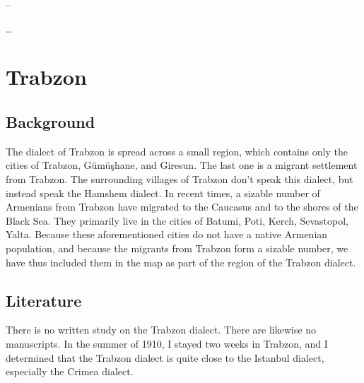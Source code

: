 – 

… 



\chapter{Trabzon} \label{chapter:Trabzon}
\section{Background}
\begin{adjarianpage}\label{page:178}\end{adjarianpage}%

The dialect of Trabzon is spread across a small region, which contains only the cities of Trabzon, Gümüşhane, and Giresun. The last one is a migrant settlement from Trabzon. The surrounding villages of Trabzon don't speak this dialect, but instead speak the Hamshem dialect. In recent times, a sizable number of Armenians from Trabzon have migrated to the Caucasus and to the shores of the Black Sea. They primarily live in the cities of Batumi, Poti, Kerch, Sevastopol, Yalta. Because these aforementioned cities do not have a native Armenian population, and because the migrants from Trabzon form a sizable number, we have thus included them in the map as part of the region of the Trabzon dialect. 

\section{Literature}

There is no written study on the Trabzon dialect. There are likewise no manuscripts. In the summer of 1910, I stayed two weeks in Trabzon, and I determined that the Trabzon dialect is quite close to the Istanbul dialect, especially the Crimea dialect. 

